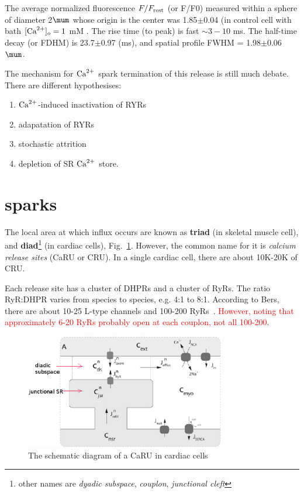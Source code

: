 The average normalized fluorescence $F/F_{\text{rest}}$ (or F/F0) measured within a
sphere of diameter 2$\mum$ whose origin is the center was 1.85$\pm$0.04 (in
control cell with bath $[{\text{Ca}^{2+}}]_o=1$ mM \citep{cheng1996csc}. The rise time (to
peak) is fast $\sim 3-10$ ms. The half-time decay (or FDHM) is 23.7$\pm$0.97
(ms), and spatial profile FWHM = 1.98$\pm$0.06$\mum$.

The mechanism for ${\text{Ca}^{2+}}$ spark termination of this release is still much
debate. There are different hypothesises:
\begin{enumerate}
  \item ${\text{Ca}^{2+}}$-induced inactivation of RYRs \citep{5,6}
  \item adapatation of RYRs \citep{7,8}
  \item stochastic attrition \citep{1}
  \item depletion of SR ${\text{Ca}^{2+}}$ store.
\end{enumerate}

\section{\texorpdfstring{ sparks}{Ca2+ sparks}}
\label{sec:ceca2+-sparks}


The local area at which  influx occurs are known as
{\bf triad} (in skeletal muscle cell), and {\bf
  diad}\footnote{other
  names are {\it dyadic subspace}, {\it couplon},
  {\it junctional cleft}} (in cardiac cells),
Fig.~\ref{fig:schematic_CaRU}.  However, the common name for it is
{\it calcium release sites} (CaRU or CRU). In a single cardiac cell,
there are about 10K-20K of CRU.

Each release site has a cluster of DHPRs and a cluster of RyRs. The
ratio RyR:DHPR varies from species to species, e.g. 4:1 to
8:1. According to Bers, there are about 10-25 L-type 
channels and 100-200 RyRs~\citep{bers2008cca}. 
\textcolor{red}{However, noting that approximately 6-20 RyRs probably
  open at each couplon, not all 100-200}.

\begin{figure}[hbt]
  \centerline{\includegraphics[height=5cm]{./images/CaRU.eps}}
  \caption{The schematic diagram of a CaRU in cardiac cells}
  \label{fig:schematic_CaRU}
\end{figure}

